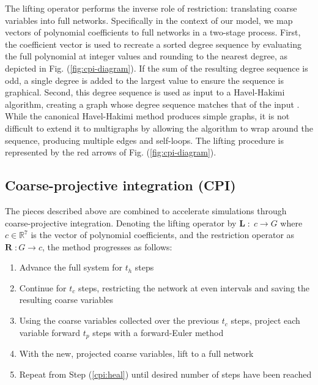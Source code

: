 \documentclass[epjST, final]{svjour}
\begin{document}
\begin{onehalfspace}
The lifting operator performs the inverse role of restriction: translating coarse variables into full networks. Specifically in the context of our model, we map vectors of polynomial coefficients to full networks in a two-stage process. First, the coefficient vector is used to recreate a sorted degree sequence by evaluating the full polynomial at integer values and rounding to the nearest degree, as depicted in Fig. (\ref{fig:cpi-diagram}). If the sum of the resulting degree sequence is odd, a single degree is added to the largest value to ensure the sequence is graphical. Second, this degree sequence is used as input to a Havel-Hakimi algorithm, creating a graph whose degree sequence matches that of the input \cite{havel_remark_1955,hakimi_realizability_1962}. While the canonical Havel-Hakimi method produces simple graphs, it is not difficult to extend it to multigraphs by allowing the algorithm to wrap around the sequence, producing multiple edges and self-loops. The lifting procedure is represented by the red arrows of Fig. (\ref{fig:cpi-diagram}).

\subsection{Coarse-projective integration (CPI)}
\label{sec:cpi}

The pieces described above are combined to accelerate simulations through coarse-projective integration. Denoting the lifting operator by $\mathbf{L} \; : \; c \rightarrow G$ where $c \in \mathbb{R}^7$ is the vector of polynomial coefficients, and the restriction operator as $\mathbf{R} \; : G \rightarrow c$, the method progresses as follows:

\begin{enumerate}
\item Advance the full system for $t_h$ steps
\label{cpi:heal}
\item Continue for $t_c$ steps, restricting the network at even intervals and saving the resulting coarse variables
\item Using the coarse variables collected over the previous $t_c$ steps, project each variable forward $t_p$ steps with a forward-Euler method
\label{cpi:proj}
\item With the new, projected coarse variables, lift to a full network
\label{cpi:init}
\item Repeat from Step (\ref{cpi:heal}) until desired number of steps have been reached
\end{enumerate}


\end{onehalfspace}
\end{document}

